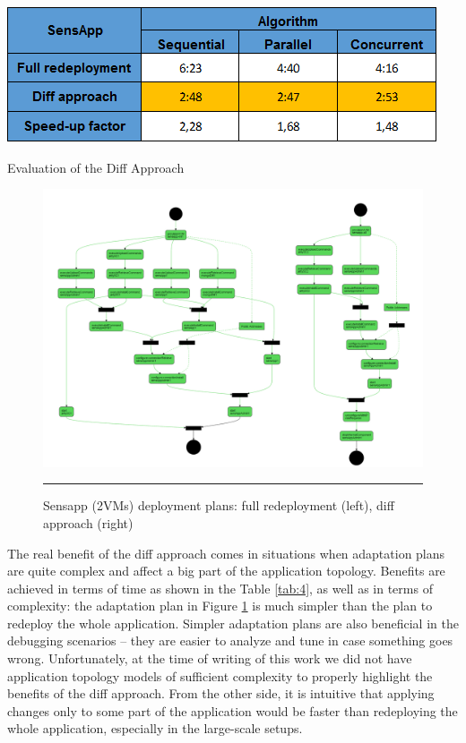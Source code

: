 \begin{center}	\includegraphics{./Figures/diff}
	\begin{table}[htbp]
    \caption{Evaluation of the Diff Approach}
    \label{tab:4}
	\end{table}
\end{center} 

\begin{figure}[htbp]
	\centering	\includegraphics[width=38em]{./Figures/Sensapp_diff}
		\rule{38em}{0.5pt}
	\caption[SensApp Adaptation]{Sensapp (2VMs) deployment plans: full redeployment (left), diff approach (right)}
	\label{fig:sensapp_adaptation}
\end{figure}

\noindent

\noindent The real benefit of the diff approach comes in situations when adaptation plans are quite complex and affect a big part of the application topology. Benefits are achieved in terms of time as shown in the Table \ref{tab:4}, as well as in terms of complexity: the adaptation plan in Figure \ref{fig:sensapp_adaptation} is much simpler than the plan to redeploy the whole application. Simpler adaptation plans are also beneficial in the debugging scenarios -- they are easier to analyze and tune in case something goes wrong. Unfortunately, at the time of writing of this work we did not have application topology models of sufficient complexity to properly highlight the benefits of the diff approach. From the other side, it is intuitive that applying changes only to some part of the application would be faster than redeploying the whole application, especially in the large-scale setups. 

